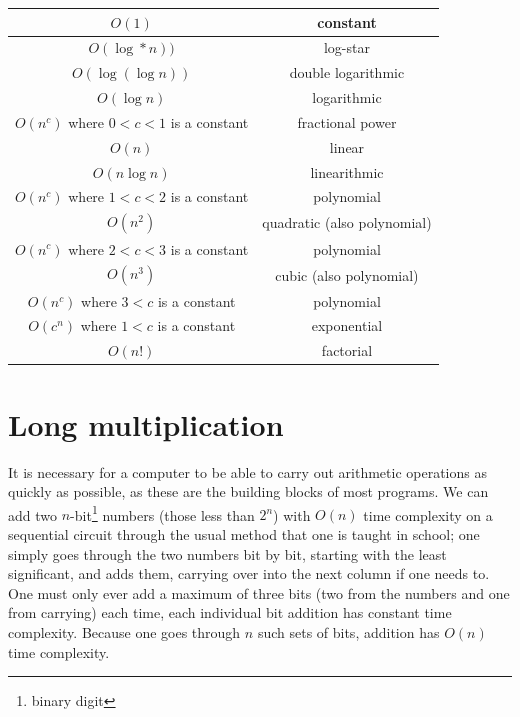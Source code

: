 \documentclass{article}
\begin{document}
\begin{center}
	\begin{tabular}{c|c}
		\(O(1)\)&constant\\\hline
		\(O(\log*n))\)&log-star\footnotemark\\\hline
		\(O(\log(\log{}n))\)&double logarithmic\\\hline
		\(O(\log{}n)\)&logarithmic\\\hline
		\(O(n^c)\) where \(0<c<1\) is a constant&fractional power\\\hline
		\(O(n)\)&linear\\\hline
		\(O(n\log{}n)\)&linearithmic\\\hline
		\(O(n^c)\) where \(1<c<2\) is a constant&polynomial\\\hline
		\(O(n^2)\)&quadratic (also polynomial)\\\hline
		\(O(n^c)\) where \(2<c<3\) is a constant&polynomial\\\hline
		\(O(n^3)\)&cubic (also polynomial)\\\hline
		\(O(n^c)\) where \(3<c\) is a constant&polynomial\\\hline
		\(O(c^n)\) where \(1<c\) is a constant&exponential\\\hline
		\(O(n!)\)&factorial
	\end{tabular}
\end{center}

\section{Long multiplication}

It is necessary for a computer to be able to carry out arithmetic operations as quickly as possible, as these are the building blocks of most programs. We can add two \(n\)-bit\footnote{binary digit} numbers (those less than \(2^n\)) with \(O(n)\) time complexity on a sequential circuit through the usual method that one is taught in school; one simply goes through the two numbers bit by bit, starting with the least significant, and adds them, carrying over into the next column if one needs to. One must only ever add a maximum of three bits (two from the numbers and one from carrying) each time, each individual bit addition has constant time complexity. Because one goes through \(n\) such sets of bits, addition has \(O(n)\) time complexity.
\end{document}
